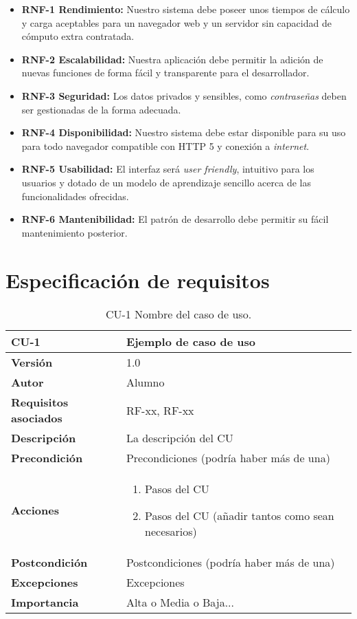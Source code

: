 \begin{itemize}
    \item \textbf{RNF-1 Rendimiento:} Nuestro sistema debe poseer unos tiempos de cálculo y carga aceptables para un navegador web y un servidor sin capacidad de cómputo extra contratada.
    \item \textbf{RNF-2 Escalabilidad:} Nuestra aplicación debe permitir la adición de nuevas funciones de forma fácil y transparente para el desarrollador.
    \item \textbf{RNF-3 Seguridad:} Los datos privados y sensibles, como \textit{contraseñas} deben ser gestionadas de la forma adecuada.
    \item \textbf{RNF-4 Disponibilidad:} Nuestro sistema debe estar disponible para su uso para todo navegador compatible con HTTP 5 y conexión a \textit{internet}.
    \item \textbf{RNF-5 Usabilidad:} El interfaz será \textit{user friendly}, intuitivo para los usuarios y dotado de un modelo de aprendizaje sencillo acerca de las funcionalidades ofrecidas.
    \item \textbf{RNF-6 Mantenibilidad:} El patrón de desarrollo debe permitir su fácil mantenimiento posterior.
\end{itemize}


\section{Especificación de requisitos}

\begin{table}[p]
	\centering
	\begin{tabularx}{\linewidth}{ p{} p{} }
		\toprule
		\textbf{CU-1}    & \textbf{Ejemplo de caso de uso}\\
		\toprule
		\textbf{Versión}              & 1.0    \\
		\textbf{Autor}                & Alumno \\
		\textbf{Requisitos asociados} & RF-xx, RF-xx \\
		\textbf{Descripción}          & La descripción del CU \\
		\textbf{Precondición}         & Precondiciones (podría haber más de una) \\
		\textbf{Acciones}             &
		\begin{enumerate}
			\def\labelenumi{\arabic{enumi}.}
			\tightlist
			\item Pasos del CU
			\item Pasos del CU (añadir tantos como sean necesarios)
		\end{enumerate}\\
		\textbf{Postcondición}        & Postcondiciones (podría haber más de una) \\
		\textbf{Excepciones}          & Excepciones \\
		\textbf{Importancia}          & Alta o Media o Baja... \\
		\bottomrule
	\end{tabularx}
	\caption{CU-1 Nombre del caso de uso.}
\end{table}

